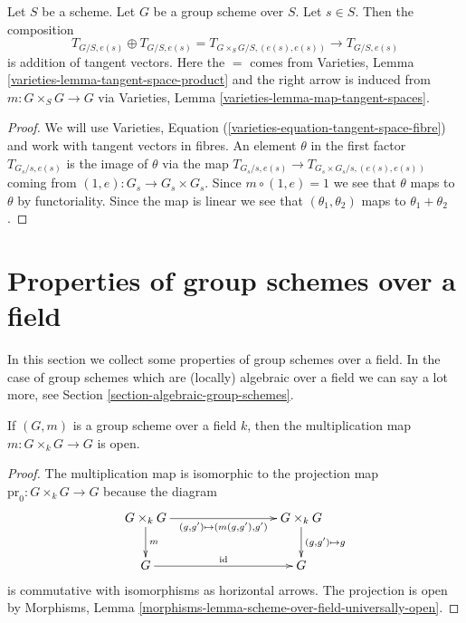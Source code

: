\begin{lemma}
\label{lemma-group-scheme-addition-tangent-vectors}
Let $S$ be a scheme. Let $G$ be a group scheme over $S$.
Let $s \in S$. Then the composition
$$
T_{G/S, e(s)} \oplus T_{G/S, e(s)} = T_{G \times_S G/S, (e(s), e(s))}
\rightarrow T_{G/S, e(s)}
$$
is addition of tangent vectors. Here the $=$ comes from
Varieties, Lemma \ref{varieties-lemma-tangent-space-product}
and the right arrow is induced from $m : G \times_S G \to G$ via
Varieties, Lemma \ref{varieties-lemma-map-tangent-spaces}.
\end{lemma}

\begin{proof}
We will use Varieties, Equation (\ref{varieties-equation-tangent-space-fibre})
and work with tangent vectors in fibres.
An element $\theta$ in the first factor $T_{G_s/s, e(s)}$
is the image of $\theta$ via the map
$T_{G_s/s, e(s)} \to T_{G_s \times G_s/s, (e(s), e(s))}$
coming from $(1, e) : G_s \to G_s \times G_s$.
Since $m \circ (1, e) = 1$ we see that $\theta$ maps to $\theta$
by functoriality. Since the map is linear we see that
$(\theta_1, \theta_2)$ maps to $\theta_1 + \theta_2$.
\end{proof}





\section{Properties of group schemes over a field}
\label{section-properties-group-schemes-field}

\noindent
In this section we collect some properties of group schemes over a
field. In the case of group schemes which are (locally) algebraic
over a field we can say a lot more, see
Section \ref{section-algebraic-group-schemes}.

\begin{lemma}
\label{lemma-group-scheme-over-field-open-multiplication}
If $(G, m)$ is a group scheme over a field $k$, then the
multiplication map $m : G \times_k G \to G$ is open.
\end{lemma}

\begin{proof}
The multiplication map is isomorphic to the projection map
$\text{pr}_0 : G \times_k G \to G$
because the diagram
$$
\xymatrix{
G \times_k G \ar[d]^m \ar[rrr]_{(g, g') \mapsto (m(g, g'), g')} & & &
G \times_k G \ar[d]^{(g, g') \mapsto g} \\
G \ar[rrr]^{\text{id}} & & & G
}
$$
is commutative with isomorphisms as horizontal arrows. The projection
is open by
Morphisms, Lemma \ref{morphisms-lemma-scheme-over-field-universally-open}.
\end{proof}

